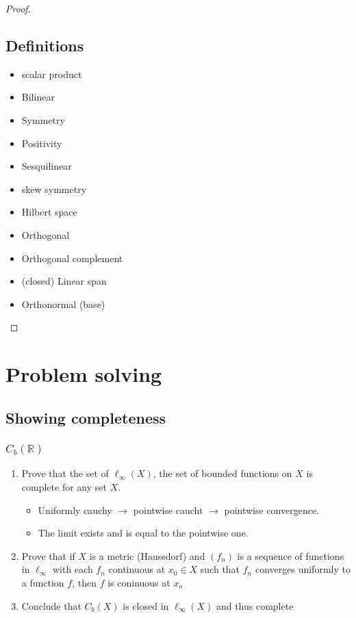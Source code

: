\documentclass[titlepage]{article}
\begin{document}
\begin{proof}
\subsection{Definitions}
\begin{itemize}
\item scalar product
\item Bilinear
\item Symmetry 
\item Positivity
\item Sesquilinear
\item skew symmetry
\item Hilbert space
\item Orthogonal
\item Orthogonal complement
\item (closed) Linear span
\item Orthonormal (base)
\end{itemize}

\end{proof}

\section{Problem solving}
\subsection{Showing completeness}
\subsubsection{$C_b(\mathbb{R})$}
\begin{enumerate}
\item Prove that the set of $\ell_\infty(X)$, the set of bounded functions on $X$ is complete for any set $X$.
\begin{itemize}
\item Uniformly cauchy $\rightarrow$ pointwise caucht $\rightarrow$ pointwise convergence.
\item The limit exists and is equal to the pointwise one.
\end{itemize}
\item Prove that if $X$ is a metric (Haussdorf) and $(f_n)$ is a sequence of functions in $\ell_\infty$ with each $f_n$ continuous at $x_0\in X$ such that $f_n$ converges uniformly to a function $f$, then $f$ is coninuous at $x_o$
\item Conclude that $C_b(X)$ is closed in $\ell_\infty(X)$ and thus complete
\end{enumerate}
\end{document}
